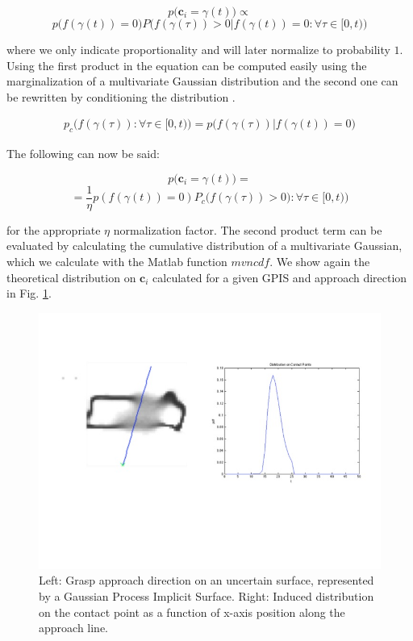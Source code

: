 \documentclass[letterpaper, 10 pt, conference]{ieeeconf}  %
\begin{document}
\[
  p\big(\textbf{c}_i = \gamma(t)\big) \propto 
\]
\[
  p\big(f(\gamma(t)) = 0\big)P\big(f(\gamma(\tau)) > 0 | f(\gamma(t)) = 0: \forall \tau \in [0,t)\big)
\]

where we only indicate proportionality and will later normalize to probability $1$.
Using the first product in the equation can be computed easily using the marginalization of a multivariate Gaussian distribution and the second one can be rewritten by conditioning the distribution \cite{petersen2008matrix}. 

\begin{align*}
p_c\big(f(\gamma(\tau)): \forall \tau \in [0,t)\big) = p\big(f(\gamma(\tau))  | f(\gamma(t)) = 0\big)  
\end{align*}


The following can now be said:

\[
  p\big(\textbf{c}_i = \gamma(t)\big) = 
\]
\[
  = \frac{1}{\eta} p(f(\gamma(t)) = 0) P_c\big(f(\gamma(\tau)) > 0): \forall \tau \in [0,t)\big)			 
\]

for the appropriate $\eta$ normalization factor.
The second product term can be evaluated by calculating the cumulative distribution of a multivariate Gaussian, which we calculate with the Matlab function $mvncdf$.
We show again the theoretical distribution on $\textbf{c}_i$ calculated for a given GPIS and approach direction in Fig.
\ref{fig:GraspContactPt}.

\begin{figure}[ht!]
\centering
\includegraphics[scale = 0.3]{figures/Slide04.jpg}
\caption{Left: Grasp approach direction on an uncertain surface, represented by a Gaussian Process Implicit Surface.  Right: Induced distribution on the contact point as a function of x-axis position along the approach line.}
\vspace*{-10pt}
\label{fig:GraspContactPt}
\end{figure}
\end{document}
